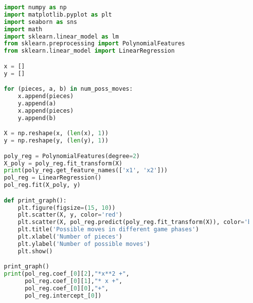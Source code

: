 \begin{lstlisting}[language=Python]
import numpy as np
import matplotlib.pyplot as plt
import seaborn as sns
import math
import sklearn.linear_model as lm
from sklearn.preprocessing import PolynomialFeatures
from sklearn.linear_model import LinearRegression

x = []
y = []

for (pieces, a, b) in num_poss_moves:
    x.append(pieces)
    y.append(a)
    x.append(pieces)
    y.append(b)

X = np.reshape(x, (len(x), 1))
y = np.reshape(y, (len(y), 1))

poly_reg = PolynomialFeatures(degree=2)
X_poly = poly_reg.fit_transform(X)
print(poly_reg.get_feature_names(['x1', 'x2']))
pol_reg = LinearRegression()
pol_reg.fit(X_poly, y)

def print_graph():
    plt.figure(figsize=(15, 10))
    plt.scatter(X, y, color='red')
    plt.scatter(X, pol_reg.predict(poly_reg.fit_transform(X)), color='blue')
    plt.title('Possible moves in different game phases')
    plt.xlabel('Number of pieces')
    plt.ylabel('Number of possible moves')
    plt.show()

print_graph()
print(pol_reg.coef_[0][2],"*x**2 +",
      pol_reg.coef_[0][1],"* x +",
      pol_reg.coef_[0][0],"+",
      pol_reg.intercept_[0])
\end{lstlisting}
